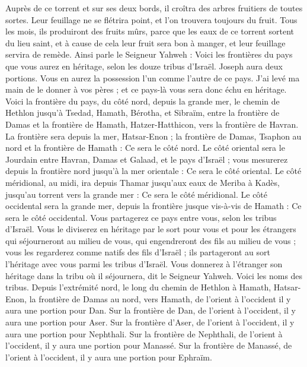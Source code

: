 \begin{multicols}{2}
Auprès de ce torrent et sur ses deux bords, il croîtra des arbres fruitiers de toutes sortes. Leur feuillage ne se flétrira point, et l'on trouvera toujours du fruit. Tous les mois, ils produiront des fruits mûrs, parce que les eaux de ce torrent sortent du lieu saint, et à cause de cela leur fruit sera bon à manger, et leur feuillage servira de remède\FTNT{}.
Ainsi parle le Seigneur Yahweh : Voici les frontières du pays que vous aurez en héritage, selon les douze tribus d'Israël. Joseph aura deux portions.
Vous en aurez la possession l'un comme l'autre de ce pays. J'ai levé ma main de le donner à vos pères ; et ce pays-là vous sera donc échu en héritage\FTNT{}.
Voici la frontière du pays, du côté nord, depuis la grande mer, le chemin de Hethlon jusqu’à Tsedad,
Hamath, Bérotha, et Sibraïm, entre la frontière de Damas et la frontière de Hamath, Hatzer-Hatthicon, vers la frontière de Havran.
La frontière sera depuis la mer, Hatsar-Enon ; la frontière de Damas, Tsaphon au nord et la frontière de Hamath : Ce sera le côté nord.
Le côté oriental sera le Jourdain entre Havran, Damas et Galaad, et le pays d'Israël ; vous mesurerez depuis la frontière nord jusqu’à la mer orientale : Ce sera le côté oriental.
Le côté méridional, au midi, ira depuis Thamar jusqu’aux eaux de Meriba à Kadès, jusqu’au torrent vers la grande mer : Ce sera le côté méridional.
Le côté occidental sera la grande mer, depuis la frontière jusque vis-à-vis de Hamath : Ce sera le côté occidental.
Vous partagerez ce pays entre vous, selon les tribus d'Israël.
Vous le diviserez en héritage par le sort pour vous et pour les étrangers qui séjourneront au milieu de vous, qui engendreront des fils au milieu de vous ; vous les regarderez comme natifs des fils d’Israël ; ils partageront au sort l’héritage avec vous parmi les tribus d’Israël.
Vous donnerez à l'étranger son héritage dans la tribu où il séjournera, dit le Seigneur Yahweh.
\VerseOne{}Voici les noms des tribus. Depuis l’extrémité nord, le long du chemin de Hethlon à Hamath, Hatsar-Enon, la frontière de Damas au nord, vers Hamath, de l'orient à l'occident il y aura une portion pour Dan.
Sur la frontière de Dan, de l’orient à l’occident, il y aura une portion pour Aser.
Sur la frontière d'Aser, de l’orient à l’occident, il y aura une portion pour Nephthali.
Sur la frontière de Nephthali, de l’orient à l’occident, il y aura une portion pour Manassé.
Sur la frontière de Manassé, de l’orient à l’occident, il y aura une portion pour Ephraïm.

\end{multicols}
